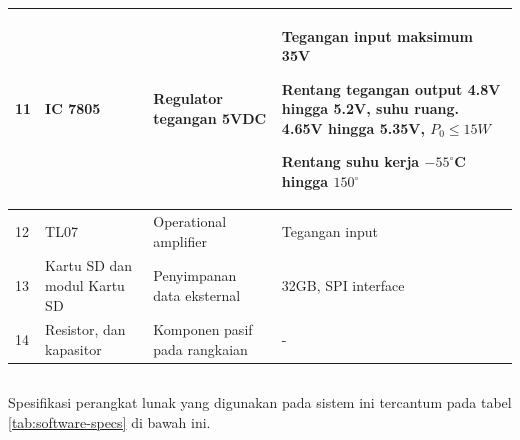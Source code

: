 \documentclass{elsinta}
\begin{document}
\begin{longtable} {|p{1cm}|p{3cm}|p{3cm}|p{6cm}|}
    11&
    IC 7805\cite{L7800}&
    Regulator tegangan 5VDC&
    Tegangan input maksimum 35V
    
    Rentang tegangan output 4.8V hingga 5.2V, suhu ruang.
    4.65V hingga 5.35V, $P_{0}\leq15W$
    
    Rentang suhu kerja $-55^{\circ}$C hingga $150^{\circ}$\\
    \hline

    12&
    TL07&
    Operational amplifier&
    Tegangan input\\
    \hline

    13&
    Kartu SD dan modul Kartu SD&
    Penyimpanan data eksternal&
    32GB, SPI interface\\
    \hline

    14&
    Resistor, dan kapasitor&
    Komponen pasif pada rangkaian&
    -\\
    \hline
\end{longtable}

\subsection{\SoftwareSpecTitle}
Spesifikasi perangkat lunak yang digunakan
pada sistem ini tercantum pada tabel \ref{tab:software-specs}
di bawah ini.
\end{document}
